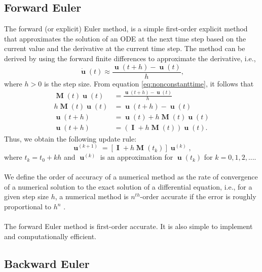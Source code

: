 \documentclass[12pt, oneside]{report}   	%
\newtheorem{defn}{Definition}
\DeclarePairedDelimiter{\norm}{\lVert}{\rVert}        %
\DeclareMathOperator{\Id}{\boldsymbol{I}}
\DeclareMathOperator{\MM}{\boldsymbol{M}}
\DeclareMathOperator{\uu}{\boldsymbol{u}}
\begin{document}
\subsection{Forward Euler}

The forward (or explicit) Euler method, is a simple first-order explicit method that approximates the solution of an ODE at the next time step based on the current value and the derivative at the current time step. The method can be derived by using the forward finite differences to approximate the derivative, i.e., 
$$
\dot{\uu}(t) \approx \frac{\uu(t+h)-\uu(t)}{h},
$$
where $h>0$ is the step size. From equation \eqref{eq:nonconstanttime}, it follows that
\begin{align*}
\MM(t)\uu(t) &= \frac{\uu(t+h)-\uu(t)}{h} \\
h\MM(t)\uu(t) &= \uu(t+h)-\uu(t) \\
\uu(t+h) &= \uu(t) + h\MM(t)\uu(t) \\
\uu(t+h) &= (\Id + h\MM(t))\uu(t).
\end{align*}
Thus, we obtain the following update rule:
\begin{equation}
\uu^{(k+1)} = [\Id + h\MM(t_k)]\uu^{(k)},
\end{equation}
where $t_k = t_0+kh$ and $\uu^{(k)}$ is an approximation for $\uu(t_k)$ for $k=0,1,2,...$.\\\\
We define the order of accuracy of a numerical method as the rate of convergence of a numerical solution to the exact solution of a differential equation, i.e., for a given step size $h$, a numerical method is $n^{th}$-order accurate if the error is roughly proportional to $h^n$ \cite{leveque2007finite}.\\\\

\noindent The forward Euler method is first-order accurate. It is also simple to implement and computationally efficient.

\subsection{Backward Euler}
\end{document}
